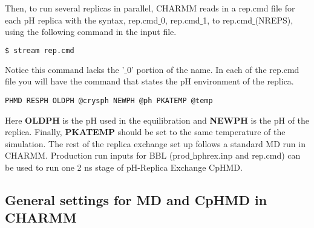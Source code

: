Then, to run several replicas in parallel, CHARMM reads in a rep.cmd file for each pH replica 
with the syntax, rep.cmd$\_$0, rep.cmd$\_$1, to rep.cmd$\_$(NREPS), using the following 
command in the input file.
%
\begin{lstlisting}[language=bash]
$ stream rep.cmd
\end{lstlisting}
% 
Notice this command lacks the '$\_0$' portion of the name.
In each of the rep.cmd file you will have the command that states the pH environment of the replica.
%
\begin{lstlisting}
PHMD RESPH OLDPH @crysph NEWPH @ph PKATEMP @temp
\end{lstlisting}
%
Here \textbf{OLDPH} is the pH used in the equilibration and \textbf{NEWPH} is the pH of the replica.
Finally, \textbf{PKATEMP} should be set to the same temperature of the simulation. 
The rest of the replica exchange set up follows a standard MD run in CHARMM.
Production run inputs for BBL (prod$\_$hphrex.inp and rep.cmd) can be used to run one 2 ns stage of pH-Replica Exchange CpHMD.

\subsection{General settings for MD and CpHMD in CHARMM}

